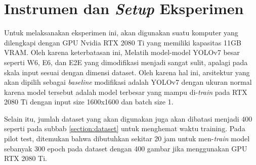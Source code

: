\section{Instrumen dan \emph{Setup} Eksperimen}
  Untuk melaksanakan eksperimen ini, akan digunakan suatu komputer yang dilengkapi dengan
  GPU Nvidia RTX 2080 Ti yang memiliki kapasitas 11GB VRAM. Oleh karena keterbatasan ini,
  Melatih model-model YOLOv7 besar seperti W6, E6, dan E2E yang dimodifikasi menjadi sangat sulit,
  apalagi pada skala input sesuai dengan dimensi dataset.
  Oleh karena hal ini, arsitektur yang akan dipilih sebagai \emph{baseline} modifikasi adalah YOLOv7 dengan
  ukuran normal karena model tersebut adalah model terbesar yang mampu di-\emph{train} pada RTX 2080 Ti dengan 
  input size 1600x1600 dan batch size 1.

  Selain itu, jumlah dataset yang akan digunakan juga akan dibatasi menjadi 400 seperti pada subbab \ref{section:dataset} untuk menghemat waktu training.
  Pada pilot test, ditemukan bahwa dibutuhkan sekitar 20 jam untuk men-\emph{train} model sebanyak 300 epoch pada dataset dengan 400 gambar jika menggunakan
  GPU RTX 2080 Ti.






